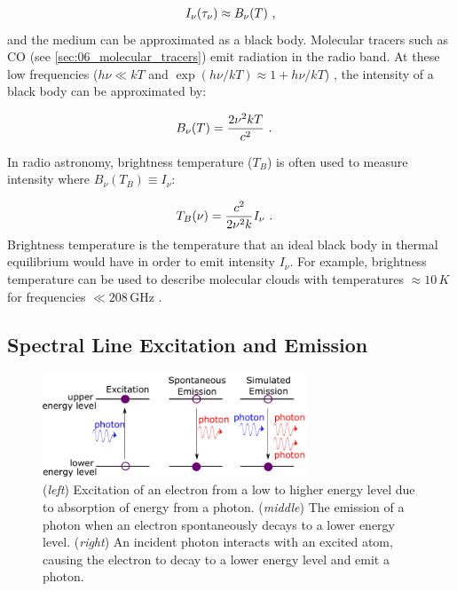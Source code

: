 \begin{equation}
    \begin{aligned}
        I_\nu\qty(\tau_\nu)\approx B_\nu\qty(T) \text{ ,}
    \end{aligned}
\end{equation}
\noindent and the medium can be approximated as a black body. Molecular tracers such as CO (see \autoref{sec:06_molecular_tracers}) emit radiation in the radio band. At these low frequencies ($h\nu\ll kT$ and $\exp(h\nu/kT)\approx1+h\nu/kT$) , the intensity of a black body can be approximated by:

\begin{equation}
    \begin{aligned}
        B_\nu\qty(T)&=\frac{2\nu^2kT}{c^2}\text{ .}
    \end{aligned}
\end{equation}

In radio astronomy, brightness temperature ($T_B$) is often used to measure intensity where $B_\nu(T_B)\equiv I_\nu$:

\begin{equation}
    \begin{aligned}
        T_B\qty(\nu)&=\frac{c^2}{2\nu^2 k}I_\nu\text{ .}
    \end{aligned} \label{eq:chapter_6_brightness_temp}
\end{equation}
\noindent Brightness temperature is the temperature that an ideal black body in thermal equilibrium would have in order to emit intensity $I_\nu$. For example, brightness temperature can be used to describe molecular clouds with temperatures $\approx 10\,\si{K}$ for frequencies $\ll 208\,\si{\giga\hertz}$ \citep{2011hea..book.....L}.

\subsection{Spectral Line Excitation and Emission} \label{sec:interstellar_medium_excitation_emission}

\begin{figure}[b!]
	\centering
	\includegraphics[width=0.7\textwidth]{06_Interstellar_Medium/Images/Theory/emission.pdf}
	\caption{(\textit{left}) Excitation of an electron from a low to higher energy level due to absorption of energy from a photon. (\textit{middle}) The emission of a photon when an electron spontaneously decays to a lower energy level. (\textit{right}) An incident photon interacts with an excited atom, causing the electron to decay to a lower energy level and emit a photon.}
	\label{fig:absorption_emission}
\end{figure}

